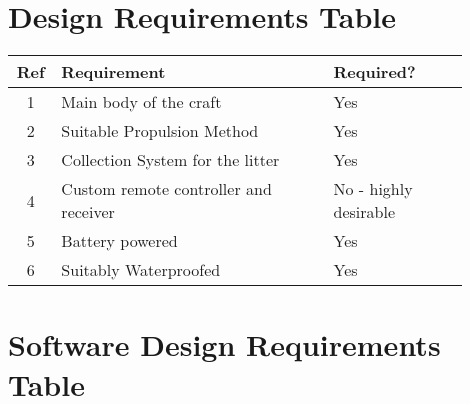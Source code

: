 \documentclass [11pt]{article}
\begin{document}
\section{Design Requirements Table}\label{app:design_requirements_hardware}

\begin{table}[H]
\begin{tabular}{||c||p{0.6\linewidth}|p{0.3\linewidth}||}
\hline
Ref & Requirement                           & Required?             \\
\hline
1   & Main body of the craft                & Yes                   \\
\hline
2   & Suitable Propulsion Method            & Yes                   \\
\hline
3   & Collection System for the litter      & Yes                   \\
\hline
4   & Custom remote controller and receiver & No - highly desirable \\
\hline
5   & Battery powered                       & Yes                   \\
\hline
6   & Suitably Waterproofed                 & Yes\\
\hline              
\end{tabular}
\end{table}

\section{Software Design Requirements Table}\label{app:design_requirements_software}
\end{document}
